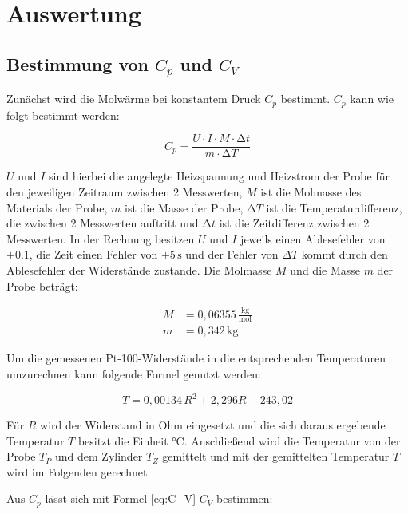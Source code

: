 \section{Auswertung}
\label{sec:Auswertung}

\subsection{Bestimmung von $C_p$ und $C_V$}
\label{sec:C_p-C_V}

Zunächst wird die Molwärme bei konstantem Druck $C_p$ bestimmt. $C_p$ kann wie folgt bestimmt werden:

\begin{equation}
    C_p = \frac{U \cdot I \cdot M \cdot \increment t}{m \cdot \increment T}
    \label{eq:C_p}
\end{equation}

$U$ und $I$ sind hierbei die angelegte Heizspannung und Heizstrom der Probe für den jeweiligen Zeitraum zwischen 2 Messwerten, $M$ ist die Molmasse des Materials der Probe, $m$ ist die Masse der Probe, $\increment T$ ist die Temperaturdifferenz, die zwischen 2 Messwerten auftritt und $\increment t$ ist die Zeitdifferenz zwischen 2 Messwerten. 
In der Rechnung besitzen $U$ und $I$ jeweils einen Ablesefehler von $\pm0.1$, die Zeit einen Fehler von $\pm5\,\si{\second}$ und der Fehler von $\Delta T$ kommt durch den Ablesefehler der Widerstände zustande. 
Die Molmasse $M$ und die Masse $m$ der Probe beträgt:

\begin{align*}
    M &= 0, \! 06355 \, \frac{\mathrm{kg}}{\mathrm{mol}} \\
    m &= 0, \! 342 \, \mathrm{kg}
\end{align*}

Um die gemessenen Pt-100-Widerstände in die entsprechenden Temperaturen umzurechnen kann folgende Formel genutzt werden:

\begin{equation}
    T = 0, \! 00134 \, R^2 + 2, \! 296 R - 243, \! 02
\end{equation}

Für $R$ wird der Widerstand in Ohm eingesetzt und die sich daraus ergebende Temperatur $T$ besitzt die Einheit °C. Anschließend wird die Temperatur von der Probe $T_P$ und dem Zylinder $T_Z$ gemittelt und mit der gemittelten Temperatur $T$ wird im Folgenden gerechnet. 

Aus $C_p$ lässt sich mit Formel \eqref{eq:C_V} $C_V$ bestimmen:

